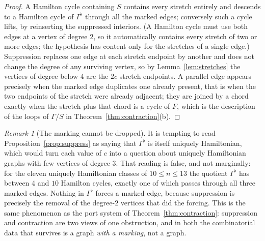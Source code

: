 \documentclass[11pt,a4paper]{article}
\theoremstyle{definition}
\theoremstyle{remark}
\newtheorem{remark}[theorem]{Remark}
\begin{document}
\begin{proof}
A Hamilton cycle containing $S$ contains every stretch entirely and descends to a Hamilton cycle of $\Gamma^{\flat}$ through all the marked edges; conversely such a cycle lifts, by reinserting the suppressed interiors. (A Hamilton cycle must use both edges at a vertex of degree $2$, so it automatically contains every stretch of two or more edges; the hypothesis has content only for the stretches of a single edge.) Suppression replaces one edge at each stretch endpoint by another and does not change the degree of any surviving vertex, so by Lemma~\ref{lem:stretches} the vertices of degree below $4$ are the $2c$ stretch endpoints. A parallel edge appears precisely when the marked edge duplicates one already present, that is when the two endpoints of the stretch were already adjacent; they are joined by a chord exactly when the stretch plus that chord is a cycle of $F$, which is the description of the loops of $\Gamma/S$ in Theorem~\ref{thm:contraction}(b).
\end{proof}

\begin{remark}[The marking cannot be dropped]\label{rem:marking}
It is tempting to read Proposition~\ref{prop:suppress} as saying that $\Gamma^{\flat}$ is itself uniquely Hamiltonian, which would turn each value of $c$ into a question about uniquely Hamiltonian graphs with few vertices of degree $3$. That reading is false, and not marginally: for the eleven uniquely Hamiltonian classes of $10\le n\le13$ the quotient $\Gamma^{\flat}$ has between $4$ and $10$ Hamilton cycles, exactly one of which passes through all three marked edges. Nothing in $\Gamma^{\flat}$ forces a marked edge, because suppression is precisely the removal of the degree-$2$ vertices that did the forcing. This is the same phenomenon as the port system of Theorem~\ref{thm:contraction}: suppression and contraction are two views of one obstruction, and in both the combinatorial data that survives is a graph \emph{with a marking}, not a graph.
\end{remark}
\end{document}
